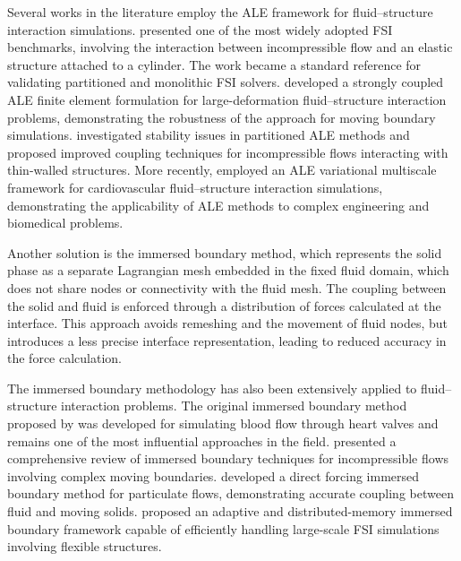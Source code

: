 \documentclass{article}
\begin{document}
Several works in the literature employ the ALE framework for fluid--structure interaction simulations. \citeauthor{turek2006} \cite{turek2006} presented one of the most widely adopted FSI benchmarks, involving the interaction between incompressible flow and an elastic structure attached to a cylinder. The work became a standard reference for validating partitioned and monolithic FSI solvers. \citeauthor{heil2004} \cite{heil2004} developed a strongly coupled ALE finite element formulation for large-deformation fluid--structure interaction problems, demonstrating the robustness of the approach for moving boundary simulations. \citeauthor{fernandez2007} \cite{fernandez2007} investigated stability issues in partitioned ALE methods and proposed improved coupling techniques for incompressible flows interacting with thin-walled structures. More recently, \citeauthor{bazilevs2013} \cite{bazilevs2013} employed an ALE variational multiscale framework for cardiovascular fluid--structure interaction simulations, demonstrating the applicability of ALE methods to complex engineering and biomedical problems.

Another solution is the immersed boundary method, which represents the solid phase as a separate Lagrangian mesh embedded in the fixed fluid domain, which does not share nodes or connectivity with the fluid mesh. The coupling between the solid and fluid is enforced through a distribution of forces calculated at the interface. This approach avoids remeshing and the movement of fluid nodes, but introduces a less precise interface representation, leading to reduced accuracy in the force calculation.

The immersed boundary methodology has also been extensively applied to fluid--structure interaction problems. The original immersed boundary method proposed by \citeauthor{peskin1972} \cite{peskin1972} was developed for simulating blood flow through heart valves and remains one of the most influential approaches in the field. \citeauthor{mittal2005} \cite{mittal2005} presented a comprehensive review of immersed boundary techniques for incompressible flows involving complex moving boundaries. \citeauthor{uhlmann2005} \cite{uhlmann2005} developed a direct forcing immersed boundary method for particulate flows, demonstrating accurate coupling between fluid and moving solids. \citeauthor{griffith2009} \cite{griffith2009} proposed an adaptive and distributed-memory immersed boundary framework capable of efficiently handling large-scale FSI simulations involving flexible structures.
\end{document}
